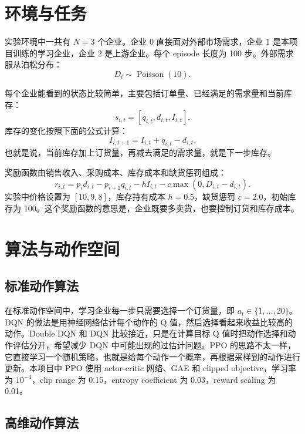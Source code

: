 \documentclass[nohyperref]{article}
\begin{document}
\section{环境与任务}

实验环境中一共有 $N=3$ 个企业。企业 $0$ 直接面对外部市场需求，企业 $1$ 是本项目训练的学习企业，企业 $2$ 是上游企业。每个 episode 长度为 100 步。外部需求服从泊松分布：
\begin{equation}
D_t \sim \operatorname{Poisson}(10).
\end{equation}

每个企业能看到的状态比较简单，主要包括订单量、已经满足的需求量和当前库存：
\begin{equation}
s_{i,t}=[q_{i,t}, d_{i,t}, I_{i,t}].
\end{equation}
库存的变化按照下面的公式计算：
\begin{equation}
I_{i,t+1}=I_{i,t}+q_{i,t}-d_{i,t}.
\end{equation}
也就是说，当前库存加上订货量，再减去满足的需求量，就是下一步库存。

奖励函数由销售收入、采购成本、库存成本和缺货惩罚组成：
\begin{equation}
r_{i,t}=p_i d_{i,t}-p_{i+1}q_{i,t}-hI_{i,t}-c\max(0,D_{i,t}-d_{i,t}).
\end{equation}
实验中价格设置为 $[10,9,8]$，库存持有成本 $h=0.5$，缺货惩罚 $c=2.0$，初始库存为 100。这个奖励函数的意思是，企业既要多卖货，也要控制订货和库存成本。

\section{算法与动作空间}

\subsection{标准动作算法}

在标准动作空间中，学习企业每一步只需要选择一个订货量，即 $a_t\in\{1,\ldots,20\}$。DQN 的做法是用神经网络估计每个动作的 Q 值，然后选择看起来收益比较高的动作。Double DQN 和 DQN 比较接近，只是在计算目标 Q 值时把动作选择和动作评估分开，希望减少 DQN 中可能出现的过估计问题。PPO 的思路不太一样，它直接学习一个随机策略，也就是给每个动作一个概率，再根据采样到的动作进行更新。本项目中 PPO 使用 actor-critic 网络、GAE 和 clipped objective，学习率为 $10^{-4}$，clip range 为 0.15，entropy coefficient 为 0.03，reward scaling 为 0.01。

\subsection{高维动作算法}
\end{document}
